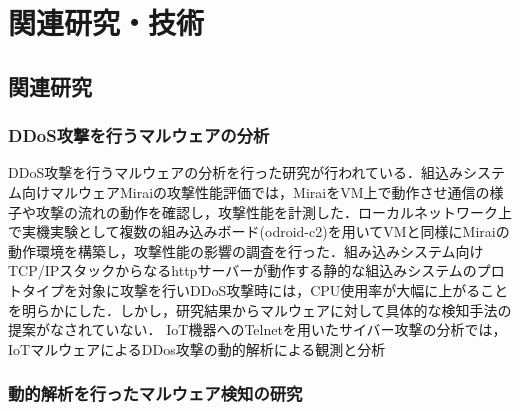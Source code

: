 \chapter{関連研究・技術}
 
\section{関連研究}

\subsection{DDoS攻撃を行うマルウェアの分析}
DDoS攻撃を行うマルウェアの分析を行った研究が行われている．組込みシステム向けマルウェアMiraiの攻撃性能評価では，MiraiをVM上で動作させ通信の様子や攻撃の流れの動作を確認し，攻撃性能を計測した．ローカルネットワーク上で実機実験として複数の組み込みボード(odroid-c2)を用いてVMと同様にMiraiの動作環境を構築し，攻撃性能の影響の調査を行った．組み込みシステム向けTCP/IPスタックからなるhttpサーバーが動作する静的な組込みシステムのプロトタイプを対象に攻撃を行いDDoS攻撃時には，CPU使用率が大幅に上がることを明らかにした．しかし，研究結果からマルウェアに対して具体的な検知手法の提案がなされていない．
IoT機器へのTelnetを用いたサイバー攻撃の分析では，
    IoTマルウェアによるDDos攻撃の動的解析による観測と分析    
\subsection{動的解析を行ったマルウェア検知の研究} %

